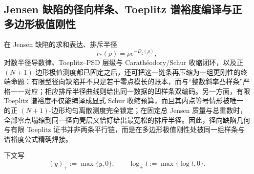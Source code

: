 \subsection{Jensen 缺陷的径向样条、Toeplitz 谱裕度编译与正多边形极值刚性}\label{subsec:conclusion-jensen-spline-toeplitz-schur-polygon-rigidity}

在 Jensen 缺陷的求和表达、排斥半径
\[
r_*(\rho)=\rho e^{-D_\zeta(\rho)},
\]
对数半径导数律、Toeplitz--PSD 层级与 Carath\'eodory/Schur 收缩闭环，以及正 \((N+1)\)-边形极值测度都已固定之后，还可把这一链条再压缩为一组更刚性的终端命题：有限型径向缺陷并不只是若干零点模长的账本，而与“整数斜率凸样条”严格一一对应；相应排斥半径曲线则给出同一数据的凹样条双编码。另一方面，有限 Toeplitz 谱裕度不仅能编译成显式 Schur 收缩预算，而且其内点等号情形被唯一的正 \((N+1)\)-边形均匀离散测度完全锁定；在固定总 Jensen 质量与总重数时，全部零点塌缩到同一径向壳层又恰好给出最宽松的排斥半径。因此，径向缺陷几何与有限 Toeplitz 证书并非两条平行链，而是在多边形极值刚性处被同一组样条与谱裕度公式精确焊接。

下文写
\[
(y)_+:=\max\{y,0\},
\qquad
\log_+ t:=\max\{\log t,0\}.
\]

